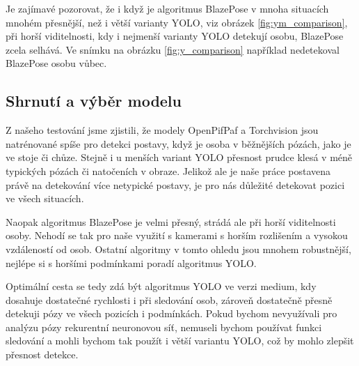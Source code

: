Je zajímavé pozorovat, že i když je algoritmus BlazePose v mnoha situacích
mnohém přesnější, než i větší varianty YOLO, viz obrázek
\ref{fig:ym_comparison}, při horší viditelnosti, kdy i nejmenší varianty YOLO
detekují osobu, BlazePose zcela selhává. Ve snímku na obrázku
\ref{fig:y_comparison} například nedetekoval BlazePose osobu vůbec.

\subsection{Shrnutí a výběr modelu}

Z našeho testování jsme zjistili, že modely OpenPifPaf a Torchvision jsou
natrénované spíše pro detekci postavy, když je osoba v běžnějších pózách, jako
je ve stoje či chůze. Stejně i u menších variant YOLO přesnost prudce klesá v
méně typických pózách či natočeních v obraze. Jelikož ale je naše práce
postavena právě na detekování více netypické postavy, je pro nás důležité
detekovat pozici ve všech situacích.

Naopak algoritmus BlazePose je velmi přesný, strádá ale při horší viditelnosti
osoby. Nehodí se tak pro naše využití s kamerami s horším rozlišením a vysokou
vzdáleností od osob. Ostatní algoritmy v tomto ohledu jsou mnohem robustnější,
nejlépe si s horšími podmínkami poradí algoritmus YOLO.

Optimální cesta se tedy zdá být algoritmus YOLO ve verzi medium, kdy dosahuje
dostatečné rychlosti i při sledování osob, zároveň dostatečně přesně detekuji
pózy ve všech pozicích i podmínkách. Pokud bychom nevyužívali pro analýzu pózy
rekurentní neuronovou síť, nemuseli bychom používat funkci sledování a mohli
bychom tak použít i větší variantu YOLO, což by mohlo zlepšit přesnost detekce.

\endinput